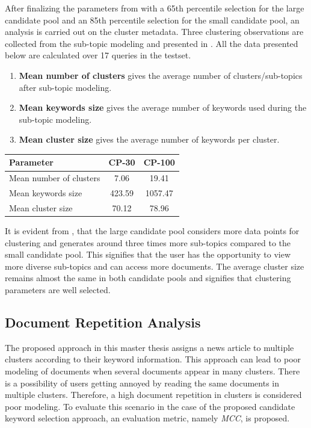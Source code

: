After finalizing the parameters from  with a 65th percentile selection for the large candidate pool and an 85th percentile selection for the small candidate pool, an analysis is carried out on the cluster metadata. Three clustering observations are collected from the sub-topic modeling and presented in . All the data presented below are calculated over 17 queries in the testset.

\begin{enumerate}
	\item \textbf{Mean number of clusters} gives the average number of clusters/sub-topics after sub-topic modeling.
	\item \textbf{Mean keywords size} gives the average number of keywords used during the sub-topic modeling.
	\item \textbf{Mean cluster size} gives the average number of keywords per cluster.
\end{enumerate}

\begin{center}
	\label{tab:keyword_analysis}
	\begin{tabularx}{.6\textwidth}{|Y|c|c|}
		\hline
		Parameter & CP-30 & CP-100 \\
		\hline
		Mean number of clusters & 7.06 & 19.41 \\
		\hline
		Mean keywords size & 423.59 & 1057.47 \\
		\hline
		Mean cluster size & 70.12 & 78.96 \\
		\hline
	\end{tabularx}
\end{center}

It is evident from , that the large candidate pool considers more data points for clustering and generates around three times more sub-topics compared to the small candidate pool. This signifies that the user has the opportunity to view more diverse sub-topics and can access more documents. The average cluster size remains almost the same in both candidate pools and signifies that clustering parameters are well selected.

 \subsection{Document Repetition Analysis}
 
The proposed approach in this master thesis assigns a news article to multiple clusters according to their keyword information. This approach can lead to poor modeling of documents when several documents appear in many clusters. There is a possibility of users getting annoyed by reading the same documents in multiple clusters. Therefore, a high document repetition in clusters is considered poor modeling. To evaluate this scenario in the case of the proposed candidate keyword selection approach, an evaluation metric, namely \textit{\ac{MCC}}, is proposed. 

